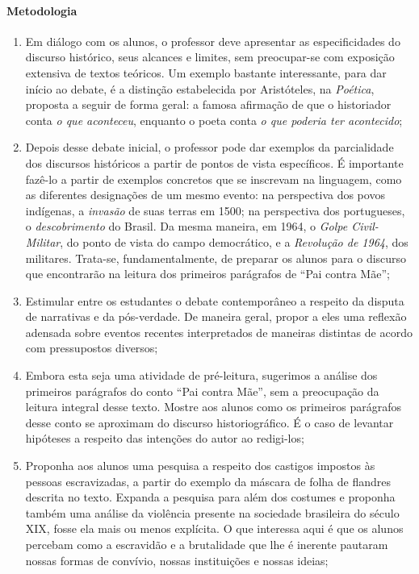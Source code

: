 \documentclass[12pt]{extarticle}
\begin{document}
\paragraph{Metodologia}

\begin{enumerate}
\item Em diálogo com os alunos, o professor deve apresentar as
especificidades do discurso histórico, seus alcances e limites, sem
preocupar-se com exposição extensiva de textos teóricos. Um exemplo
bastante interessante, para dar início ao debate, é a distinção
estabelecida por Aristóteles, na \emph{Poética}, proposta a seguir de
forma geral: a famosa afirmação de que o historiador conta \emph{o que
aconteceu}, enquanto o poeta conta \emph{o que poderia ter acontecido};

\item Depois desse debate inicial, o professor pode dar exemplos da
parcialidade dos discursos históricos a partir de pontos de vista
específicos. É importante fazê-lo a partir de exemplos concretos que se
inscrevam na linguagem, como as diferentes designações de um mesmo
evento: na perspectiva dos povos indígenas, a \emph{invasão} de suas
terras em 1500; na perspectiva dos portugueses, o \emph{descobrimento}
do Brasil. Da mesma maneira, em 1964, o \emph{Golpe Civil-Militar}, do
ponto de vista do campo democrático, e a \emph{Revolução de 1964}, dos
militares. Trata-se, fundamentalmente, de preparar os alunos para o
discurso que encontrarão na leitura dos primeiros parágrafos de ``Pai
contra Mãe'';

\item Estimular entre os estudantes o debate contemporâneo a respeito da
disputa de narrativas e da pós-verdade. De maneira geral, propor a eles
uma reflexão adensada sobre eventos recentes interpretados de maneiras
distintas de acordo com pressupostos diversos;

\item Embora esta seja uma atividade de pré-leitura, sugerimos a análise
dos primeiros parágrafos do conto ``Pai contra Mãe'', sem a preocupação
da leitura integral desse texto. Mostre aos alunos como os primeiros
parágrafos desse conto se aproximam do discurso historiográfico. É o
caso de levantar hipóteses a respeito das intenções do autor ao
redigi-los;

\item Proponha aos alunos uma pesquisa a respeito dos castigos impostos às
pessoas escravizadas, a partir do exemplo da máscara de folha de
flandres descrita no texto. Expanda a pesquisa para além dos costumes e
proponha também uma análise da violência presente na sociedade
brasileira do século XIX, fosse ela mais ou menos explícita. O que
interessa aqui é que os alunos percebam como a escravidão e a
brutalidade que lhe é inerente pautaram nossas formas de convívio,
nossas instituições e nossas ideias;


\end{enumerate}
\end{document}
